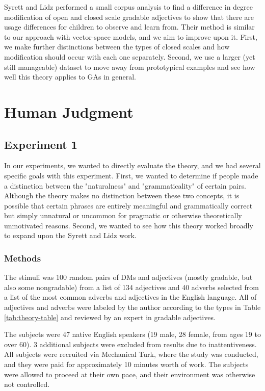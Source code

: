\documentclass[11pt]{article}
\begin{document}
Syrett and Lidz  performed a small corpus analysis to find a difference in degree modification of open and closed scale gradable adjectives to show that there are usage differences for children to observe and learn from. Their method is similar to our approach with vector-space models, and we aim to improve upon it. First, we make further distinctions between the types of closed scales and how modification should occur with each one separately. Second, we use a larger (yet still manageable) dataset to move away from prototypical examples and see how well this theory applies to GAs in general.

\section{Human Judgment}

\subsection{Experiment 1}

In our experiments, we wanted to directly evaluate the theory, and we had several specific goals with this experiment. First, we wanted to determine if people made a distinction between the "naturalness" and "grammaticality" of certain pairs. Although the theory makes no distinction between these two concepts, it is possible that certain phrases are entirely meaningful and grammatically correct but simply unnatural or uncommon for pragmatic or otherwise theoretically unmotivated reasons. Second, we wanted to see how this theory worked broadly to expand upon the Syrett and Lidz  work.

\subsubsection{Methods}
The stimuli was 100 random pairs of DMs and adjectives (mostly gradable, but also some nongradable) from a list of 134 adjectives and 40 adverbs selected from a list of the most common adverbs and adjectives in the English language. All of adjectives and adverbs were labeled by the author according to the types in Table \ref{tab:theory-table} and reviewed by an expert in gradable adjectives.

The subjects were 47 native English speakers (19 male, 28 female, from ages 19 to over 60). 3 additional subjects were excluded from results due to inattentiveness. All subjects were recruited via Mechanical Turk, where the study was conducted, and they were paid for approximately 10 minutes worth of work. The subjects were allowed to proceed at their own pace, and their environment was otherwise not controlled.
\end{document}
